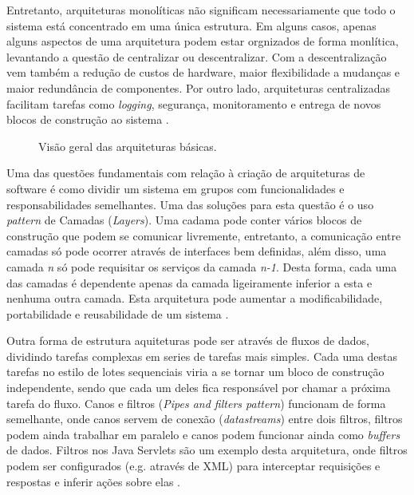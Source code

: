 \documentclass[diss]{template/setrem}
\begin{document}
Entretanto, arquiteturas monolíticas não significam necessariamente que todo o sistema está concentrado em uma única estrutura. Em alguns casos, apenas alguns aspectos de uma arquitetura podem estar orgnizados de forma monlítica, levantando a questão de centralizar ou descentralizar. Com a descentralização vem também a redução de custos de hardware, maior flexibilidade a mudanças e maior redundância de componentes. Por outro lado, arquiteturas centralizadas facilitam tarefas como \emph{logging}, segurança, monitoramento e entrega de novos blocos de construção ao sistema \citep{Vogel2011}.

\begin{figure}[!h]
    \caption{Visão geral das arquiteturas básicas.}
    \label{fig:basic-architectures}
\end{figure}

Uma das questões fundamentais com relação à criação de arquiteturas de software é como dividir um sistema em grupos com funcionalidades e responsabilidades semelhantes. Uma das soluções para esta questão é o uso \emph{pattern} de Camadas (\emph{Layers}). Uma cadama pode conter vários blocos de construção que podem se comunicar livremente, entretanto, a comunicação entre camadas só pode ocorrer através de interfaces bem definidas, além disso, uma camada \emph{n} só pode requisitar os serviços da camada \emph{n-1}. Desta forma, cada uma das camadas é dependente apenas da camada ligeiramente inferior a esta e nenhuma outra camada. Esta arquitetura pode aumentar a modificabilidade, portabilidade e reusabilidade de um sistema \citep{Vogel2011}.

Outra forma de estrutura aquiteturas pode ser através de fluxos de dados, dividindo tarefas complexas em series de tarefas mais simples. Cada uma destas tarefas no estilo de lotes sequenciais viria a se tornar um bloco de construção independente, sendo que cada um deles fica responsável por chamar a próxima tarefa do fluxo. Canos e filtros (\emph{Pipes and filters pattern}) funcionam de forma semelhante, onde canos servem de conexão (\emph{datastreams}) entre dois filtros, filtros podem ainda trabalhar em paralelo e canos podem funcionar ainda como \emph{buffers} de dados. Filtros nos Java Servlets são um exemplo desta arquitetura, onde filtros podem ser configurados (e.g. através de XML) para interceptar requisições e respostas e inferir ações sobre elas \citep{Vogel2011}.
\end{document}
